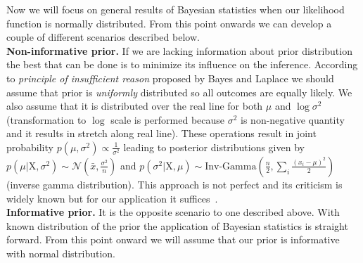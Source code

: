 \documentclass[12pt, a4paper, pdflatex, leqno]{report}
\begin{document}
Now we will focus on general results of Bayesian statistics when our likelihood function is normally distributed. From this point onwards we can develop a couple of different scenarios described below.\\

\textbf{\textrm{Non-informative prior. }}If we are lacking information about prior distribution the best that can be done is to minimize its influence on the inference. According to \emph{principle of insufficient reason} proposed by Bayes and Laplace we should assume that prior is \emph{uniformly} distributed so all outcomes are equally likely. We also assume that it is distributed over the real line for both $\mu$ and $\log \sigma^2$ (transformation to $\log$ scale is performed because $\sigma^2$ is non-negative quantity and it results in stretch along real line). These operations result in joint probability $p \left( \mu, \sigma^2 \right) \propto \frac{1}{\sigma^2} $ leading to posterior distributions given by $p \left( \mu | \mathrm{X}, \sigma^2 \right) \sim \mathcal{N} \left( \bar{x}, \frac{\sigma^2}{n} \right) $ and $p \left( \sigma^2 | \mathrm{X}, \mu \right) \sim \mathrm{Inv}\text{-}\mathrm{Gamma} \left( \frac{n}{2} , \sum_{i} \frac{\left( x_i - \mu \right)^2}{2}  \right) $ (inverse gamma distribution). This approach is not perfect and its criticism is widely known but for our application it suffices~\citep{Syversveen98noninformativebayesian}.\\


\textbf{\textrm{Informative prior. }}It is the opposite scenario to one described above. With known distribution of the prior the application of Bayesian statistics is straight forward. From this point onward we will assume that our prior is informative with normal distribution.\\
\end{document}
